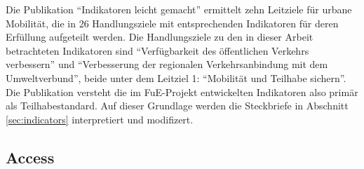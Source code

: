 \documentclass[11pt,pdftex,a4paper]{scrartcl}
\begin{document}
	Die Publikation \enquote{Indikatoren leicht gemacht} \parencite{bmdvIndikatorenLeichtGemacht2025} ermittelt zehn Leitziele für urbane Mobilität, die in \num{26} Handlungsziele mit entsprechenden Indikatoren für deren Erfüllung aufgeteilt werden. Die Handlungsziele zu den in dieser Arbeit betrachteten Indikatoren sind \enquote{Verfügbarkeit des öffentlichen Verkehrs verbessern} und \enquote{Verbesserung der regionalen Verkehrsanbindung mit dem Umweltverbund}, beide unter dem Leitziel 1: \enquote{Mobilität und Teilhabe sichern}\parencite[14]{bmdvIndikatorenLeichtGemacht2025}. Die Publikation versteht die im FuE-Projekt entwickelten Indikatoren also primär als Teilhabestandard. Auf dieser Grundlage werden die Steckbriefe in Abschnitt \ref{sec:indicators} interpretiert und modifizert.
	
	\subsection{Access}
	\label{sec:Access}
\end{document}
